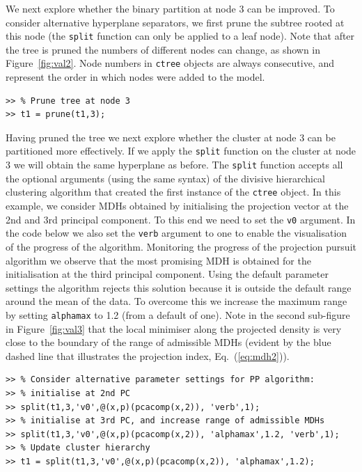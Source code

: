 \documentclass{book}
\begin{document}
%
We next explore whether the binary partition at node 3 can be improved.
%
To consider alternative hyperplane separators, we first prune the subtree
rooted at this node (the {\tt split} function can only be applied to a leaf
node). Note that after the tree is pruned the numbers of different nodes can
change, as shown in Figure~\ref{fig:val2}. Node numbers in {\tt ctree} objects
are always consecutive, and represent the order in which nodes were added to
the model.


\begin{lstlisting}
>> % Prune tree at node 3
>> t1 = prune(t1,3);
\end{lstlisting}


Having pruned the tree we next explore whether the cluster at node 3 can be
partitioned more effectively. If we apply the {\tt split} function on the
cluster at node 3 we will obtain the same hyperplane as before. 
%
The {\tt split} function accepts all the optional arguments (using the same
syntax) of the divisive hierarchical clustering algorithm that created the
first instance of the {\tt ctree} object.
%
In this example, we consider MDHs obtained by initialising the projection
vector at the 2nd and 3rd principal component. To this end we need to set the
{\tt v0} argument.
%
In the code below we also set the {\tt verb} argument to one to enable the
visualisation of the progress of the algorithm.
%
Monitoring the progress of the projection pursuit algorithm we observe that the
most promising MDH is obtained for the initialisation at the third principal
component. Using the default parameter settings the algorithm rejects this
solution because it is outside the default range around the mean of the data.
%
To overcome this we increase the maximum range by setting {\tt alphamax} to 1.2
(from a default of one). Note in the second sub-figure in Figure~\ref{fig:val3}
that the local minimiser along the projected density is very close to the
boundary of the range of admissible MDHs (evident by the blue dashed line that
illustrates the projection index, Eq.~(\ref{eq:mdh2})).


\begin{lstlisting}
>> % Consider alternative parameter settings for PP algorithm:
>> % initialise at 2nd PC
>> split(t1,3,'v0',@(x,p)(pcacomp(x,2)), 'verb',1);
>> % initialise at 3rd PC, and increase range of admissible MDHs
>> split(t1,3,'v0',@(x,p)(pcacomp(x,2)), 'alphamax',1.2, 'verb',1);
>> % Update cluster hierarchy
>> t1 = split(t1,3,'v0',@(x,p)(pcacomp(x,2)), 'alphamax',1.2);
\end{lstlisting}
\end{document}
